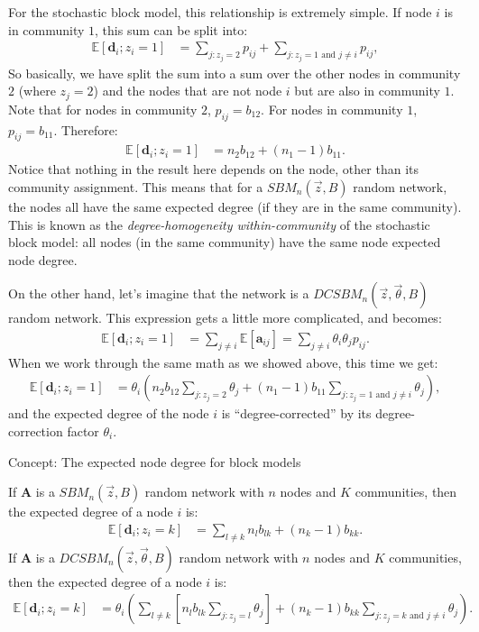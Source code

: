 For the stochastic block model, this relationship is extremely simple. If node $i$ is in community $1$, this sum can be split into:
\begin{align*}
    \mathbb E[\mathbf d_i ; z_i = 1] &= \sum_{j : z_j = 2}p_{ij} + \sum_{j : z_j = 1\text{ and }j \neq i}p_{ij},
\end{align*}
So basically, we have split the sum into a sum over the other nodes in community $2$ (where $z_j = 2$) and the nodes that are not node $i$ but are also in community $1$. Note that for nodes in community $2$, $p_{ij} = b_{12}$. For nodes in community $1$, $p_{ij} = b_{11}$. Therefore:
\begin{align*}
    \mathbb E[\mathbf d_i ; z_i = 1] &= n_2 b_{12} + (n_1 - 1) b_{11}.
\end{align*}
Notice that nothing in the result here depends on the node, other than its community assignment. This means that for a $SBM_n(\vec z, B)$ random network, the nodes all have the same expected degree (if they are in the same community). This is known as the \textit{degree-homogeneity within-community} of the stochastic block model: all nodes (in the same community) have the same node expected node degree.

On the other hand, let's imagine that the network is a $DCSBM_n(\vec z, \vec \theta, B)$ random network. This expression gets a little more complicated, and becomes:
\begin{align*}
    \mathbb E[\mathbf d_i ; z_i = 1] &= \sum_{j \neq i} \mathbb E[\mathbf a_{ij}] = \sum_{j \neq i}\theta_i\theta_j p_{ij}.
\end{align*}
When we work through the same math as we showed above, this time we get:
\begin{align*}
    \mathbb E[\mathbf d_i ; z_i = 1] &= \theta_i \left(n_2 b_{12}\sum_{j : z_j = 2}\theta_j + (n_1 - 1) b_{11}\sum_{j : z_j = 1\text{ and }j \neq i}\theta_j\right),
\end{align*}
and the expected degree of the node $i$ is ``degree-corrected'' by its degree-correction factor $\theta_i$. 

\begin{floatingbox}[h]\caption{Concept: The expected node degree for block models}
\label{box:ch5:dcsbm:exp_deg}
If $\mathbf A$ is a $SBM_n(\vec z, B)$ random network with $n$ nodes and $K$ communities, then the expected degree of a node $i$ is:
\begin{align*}
    \mathbb E[\mathbf d_i ; z_i = k] &= \sum_{l \neq k} n_l b_{lk} + (n_k - 1)b_{kk}.
\end{align*}
If $\mathbf A$ is a $DCSBM_n(\vec z, \vec \theta, B)$ random network with $n$ nodes and $K$ communities, then the expected degree of a node $i$ is:
\begin{align*}
    \mathbb E[\mathbf d_i; z_i = k] &= \theta_i \left(\sum_{l \neq k}\left[n_l b_{lk}\sum_{j : z_j = l}\theta_j\right] + (n_k - 1)b_{kk}\sum_{j : z_j = k\text{ and }j \neq i}\theta_j\right).
\end{align*}
\end{floatingbox}

\newpage